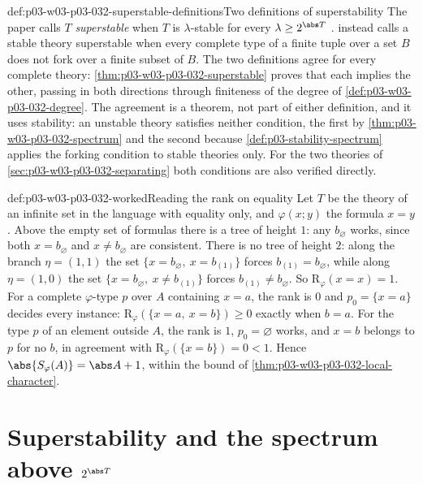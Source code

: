 \begin{hbwarning}{def:p03-w03-p03-032-superstable-definitions}{Two definitions of superstability}
The paper calls \(T\) \emph{superstable} when \(T\) is \(\lambda\)-stable for
every \(\lambda\geq2^{\abs T}\) \cite[\S~0, p.~273]{Shelah1971Stability}.
 instead calls a stable theory superstable
when every complete type of a finite tuple over a set \(B\) does not fork over
a finite subset of \(B\).  The two definitions agree for every complete
theory: \cref{thm:p03-w03-p03-032-superstable} proves that each implies the
other, passing in both directions through finiteness of the degree of
\cref{def:p03-w03-p03-032-degree}.  The agreement is a theorem, not part of
either definition, and it uses stability: an unstable theory satisfies
neither condition, the first by \cref{thm:p03-w03-p03-032-spectrum} and the
second because \cref{def:p03-stability-spectrum} applies the forking
condition to stable theories only.  For the two theories of
\cref{sec:p03-w03-p03-032-separating} both conditions are also verified
directly.
\end{hbwarning}

\begin{hbexample}{def:p03-w03-p03-032-worked}{Reading the rank on equality}
Let \(T\) be the theory of an infinite set in the language with equality
only, and \(\varphi(x;y)\) the formula \(x=y\).  Above the empty set of
formulas there is a tree of height \(1\): any \(b_\varnothing\) works, since
both \(x=b_\varnothing\) and \(x\neq b_\varnothing\) are consistent.  There
is no tree of height \(2\): along the branch \(\eta=(1,1)\) the set
\(\{x=b_\varnothing,\ x=b_{(1)}\}\) forces \(b_{(1)}=b_\varnothing\), while
along \(\eta=(1,0)\) the set \(\{x=b_\varnothing,\ x\neq b_{(1)}\}\) forces
\(b_{(1)}\neq b_\varnothing\).  So \(\mathrm R_\varphi(x=x)=1\).  For a
complete \(\varphi\)-type \(p\) over \(A\) containing \(x=a\), the rank is
\(0\) and \(p_0=\{x=a\}\) decides every instance:
\(\mathrm R_\varphi(\{x=a,\ x=b\})\geq0\) exactly when \(b=a\).  For the
type \(p\) of an element outside \(A\), the rank is \(1\), \(p_0=\varnothing\)
works, and \(x=b\) belongs to \(p\) for no \(b\), in agreement with
\(\mathrm R_\varphi(\{x=b\})=0<1\).  Hence
\(\abs{S_\varphi(A)}=\abs A+1\), within the bound of
\cref{thm:p03-w03-p03-032-local-character}.
\end{hbexample}

\section{Superstability and the spectrum above \texorpdfstring{\(2^{\abs T}\)}{2 to the |T|}}
\label{sec:p03-w03-p03-032-superstable}

